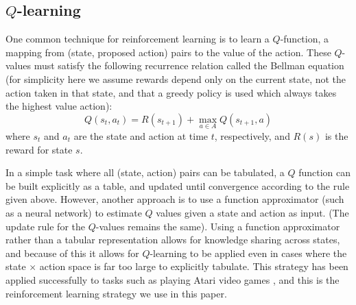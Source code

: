 \documentclass{article} %
\begin{document}
\subsection{\(Q\)-learning}
One common technique for reinforcement learning is to learn a \(Q\)-function, a mapping from (state, proposed action) pairs to the value of the action. These \(Q\)-values must satisfy the following recurrence relation called the Bellman equation (for simplicity here we assume rewards depend only on the current state, not the action taken in that state, and that a greedy policy is used which always takes the highest value action):
\[ Q(s_t,a_t) = R(s_{t+1}) + \max_{a \in A} Q(s_{t+1},a) \]
where \(s_t\) and \(a_t\) are the state and action at time \(t\), respectively, and \(R(s)\) is the reward for state \(s\). \par
In a simple task where all (state, action) pairs can be tabulated, a \(Q\) function can be built explicitly as a table, and updated until convergence according to the rule given above. However, another approach is to use a function approximator (such as a neural network) to estimate \(Q\) values given a state and action as input. (The update rule for the \(Q\)-values remains the same). Using a function approximator rather than a tabular representation allows for knowledge sharing across states, and because of this it allows for \(Q\)-learning to be applied even in cases where the state \(\times\) action space is far too large to explicitly tabulate. This strategy has been applied successfully to tasks such as playing Atari video games \cite{Mnih2015}, and this is the reinforcement learning strategy we use in this paper. \par
\end{document}
